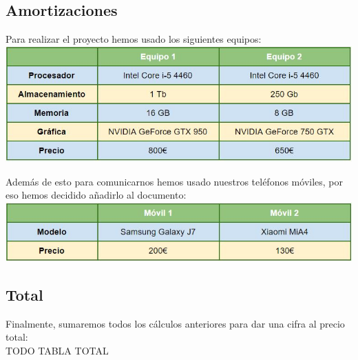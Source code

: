 \subsection{Amortizaciones}

Para realizar el proyecto hemos usado los siguientes equipos:\\

\includegraphics[width=\textwidth]{img/cap4/equipos.jpg}

\bigskip

Además de esto para comunicarnos hemos usado nuestros teléfonos móviles, por eso hemos decidido añadirlo al documento:\\

\includegraphics[width=\textwidth]{img/cap4/moviles.jpg}


\subsection{Total}	

Finalmente, sumaremos todos los cálculos anteriores para dar una cifra al precio total:\\

TODO TABLA TOTAL



	

	